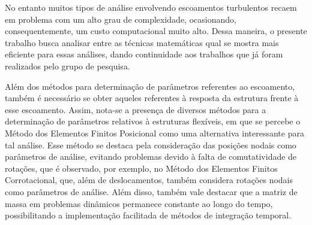 \documentclass[_ArquivoPrincipal.tex]{subfiles}
\begin{document}
No entanto muitos tipos de análise envolvendo escoamentos turbulentos recaem em problema com um alto grau de complexidade, ocasionando, consequentemente, um custo computacional muito alto. Dessa maneira, o presente trabalho busca analisar entre as técnicas matemáticas qual se mostra mais eficiente para essas análises, dando continuidade aos trabalhos que já foram realizados pelo grupo de pesquisa.

Além dos métodos para determinação de parâmetros referentes ao escoamento, também é necessário se obter aqueles referentes à resposta da estrutura frente à esse escoamento. Assim, nota-se a presença de diversos métodos para a determinação de parâmetros relativos à estruturas flexíveis, em que se percebe o Método dos Elementos Finitos Posicional como uma alternativa interessante para tal análise. Esse método se destaca pela consideração das posições nodais como parâmetros de análise, evitando problemas devido à falta de comutatividade de rotações, que é observado, por exemplo, no Método dos Elementos Finitos Corrotacional, que, além de deslocamentos, também considera rotações nodais como parâmetros de análise. Além disso, também vale destacar que a matriz de massa em problemas dinâmicos permanece constante ao longo do tempo, possibilitando a implementação facilitada de métodos de integração temporal.
\end{document}
